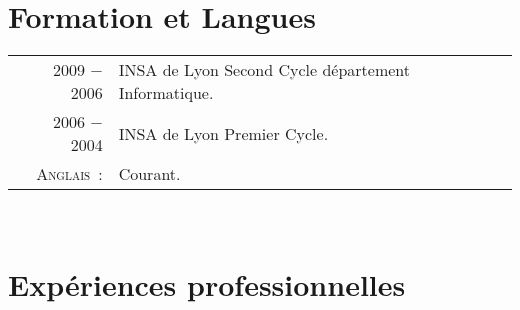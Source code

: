 \documentclass[a4paper,10pt]{article}
\begin{document}
  \section{Formation et Langues}
  \begin{tabular}{rl}
    2009 − 2006         & INSA de Lyon Second Cycle département Informatique. \\
    2006 − 2004         & INSA de Lyon Premier Cycle. \\
    \textsc{Anglais :}  & Courant. \\
  \end{tabular} \\

  \section{Expériences professionnelles}
\end{document}
